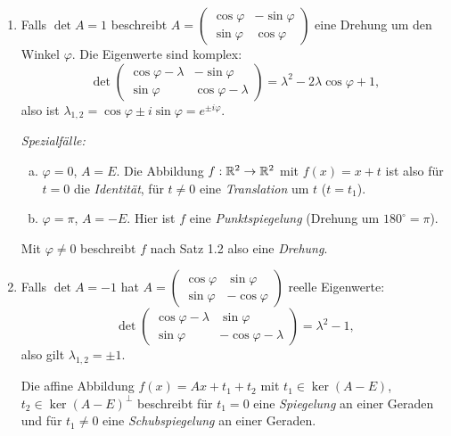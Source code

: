 \documentclass[
 a4paper,
 12pt,
 parskip=half
 ]{scrartcl}
\theoremstyle{plain}
\theoremstyle{definition}
\begin{document}
\begin{enumerate}[1)]
 \item Falls $\det A = 1$ beschreibt $A = \begin{pmatrix} \cos \varphi & - \sin \varphi \\ \sin \varphi & \cos \varphi \end{pmatrix}$ eine Drehung um den Winkel $\varphi$. Die Eigenwerte sind komplex:
 \[ \det \begin{pmatrix} \cos \varphi - \lambda & - \sin \varphi \\ \sin \varphi & \cos \varphi - \lambda \end{pmatrix} = \lambda^2 - 2 \lambda \cos \varphi + 1, \]
 also ist $\lambda_{1,2} = \cos \varphi \pm i \sin \varphi = e^{\pm i \varphi}$.
 
 \emph{Spezialfälle:}
 \begin{enumerate}[a)]
  \item $\varphi = 0$, $A = E$. Die Abbildung $f: \mathbb{R}^2 \to \mathbb{R}^2$ mit $f(x) = x + t$ ist also für $t=0$ die \emph{Identität}, für $t \ne 0$ eine \emph{Translation} um $t$ ($t = t_1$).
  \item $\varphi = \pi$, $A = -E$. Hier ist $f$ eine \emph{Punktspiegelung} (Drehung um $180^\circ = \pi$).
 \end{enumerate}
 Mit $\varphi \ne 0$ beschreibt $f$ nach Satz 1.2 also eine \emph{Drehung}.
 \item Falls $\det A = -1$ hat $A = \begin{pmatrix} \cos \varphi & \sin \varphi \\ \sin \varphi & - \cos \varphi \end{pmatrix}$ reelle Eigenwerte:
 \[ \det \begin{pmatrix} \cos \varphi - \lambda & \sin \varphi \\ \sin \varphi & - \cos \varphi - \lambda \end{pmatrix} = \lambda^2 - 1, \]
 also gilt $\lambda_{1,2} = \pm 1$.
 
 Die affine Abbildung $f(x) = Ax + t_1 + t_2$ mit $t_1 \in \ker(A-E)$, $t_2 \in \ker(A-E)^\bot$ beschreibt für $t_1 = 0$ eine \emph{Spiegelung} an einer Geraden und für $t_1 \ne 0$ eine \emph{Schubspiegelung} an einer Geraden.
\end{enumerate}
\end{document}
